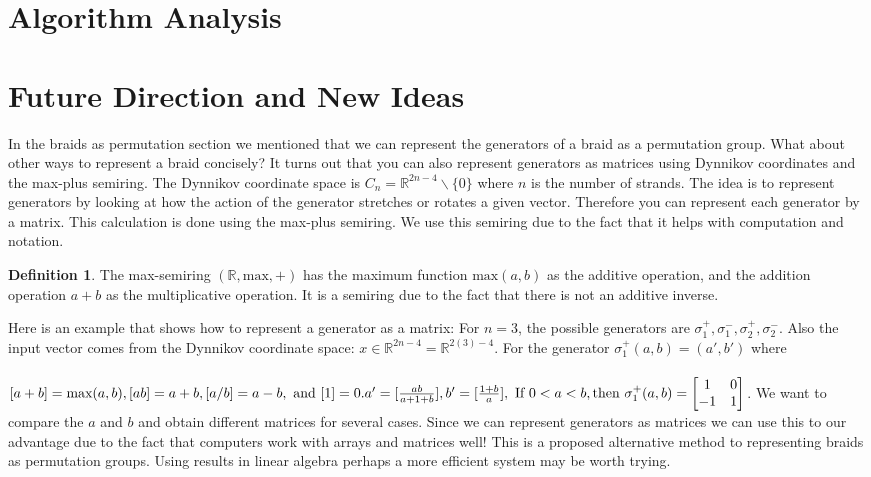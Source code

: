 \documentclass{article}
\theoremstyle{definition}
\newtheorem{definition}{Definition}[section]
\begin{document}
\section{Algorithm Analysis}


\section{Future Direction and New Ideas}
In the braids as permutation section we mentioned that we can represent the generators of a braid as a permutation group. What about other ways to represent a braid concisely? It turns out that you can also represent generators as matrices using Dynnikov coordinates and the max-plus semiring. The Dynnikov coordinate space is $C_n=\mathbb{R}^{2n-4} \backslash \{0\}$ where $n$ is the number of strands. The idea is to represent generators by looking at how the action of the generator stretches or rotates a given vector. Therefore you can represent each generator by a matrix. This calculation is done using the max-plus semiring. We use this semiring due to the fact that it helps with computation and notation. 

\begin{definition}
The max-semiring $(\mathbb{R},\text{max},+)$ has the maximum function $\text{max}(a,b)$ as the additive operation, and the addition operation $a+b$ as the multiplicative operation. It is a semiring due to the fact that there is not an additive inverse.
\end{definition}

\noindent Here is an example that shows how to represent a generator as a matrix: For $n=3$, the possible generators are $\sigma_1^+, \sigma_1^-, \sigma_2^+, \sigma_2^-$. Also the input vector comes from the Dynnikov coordinate space: $x \in \mathbb{R}^{2n-4} = \mathbb{R}^{2(3)-4}$. For the generator $\sigma_1^+ (a,b)=(a',b')$ where 
\\ \\
$[a+b]=\text{max}(a,b), [ab]=a+b, [a/b]=a-b, \text{ and } [1]=0. \\ \\ a'=[\frac{ab}{a+1+b}], b'=[\frac{1+b}{a}],   \\ \text{ If } 0<a<b , \text{then } \sigma_1^+ (a,b)=
\begin{bmatrix}
1 & 0\\
-1 & 1
\end{bmatrix} $. We want to compare the $a$ and $b$ and obtain different matrices for several cases. Since we can represent generators as matrices we can use this to our advantage due to the fact that computers work with arrays and matrices well! This is a proposed alternative method to representing braids as permutation groups. Using results in linear algebra perhaps a more efficient system may be worth trying. 
\end{document}
